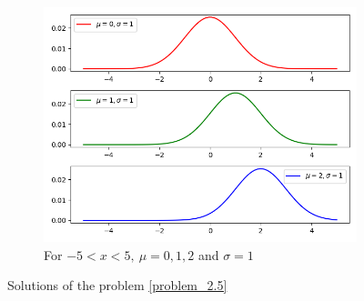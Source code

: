 \begin{figure}[h!]
\begin{subfigure}[b]{0.5\linewidth}
            \includegraphics[width=\linewidth]{img/chapter2/2-5/2_5_plot_c.png}
            \caption{For $-5<x<5, \ \mu=0,1,2$ and $\sigma=1$}
        \end{subfigure}
        \caption{Solutions of the problem \ref{problem_2.5}}
        \label{fig:problem 2-5}
    \end{figure}
